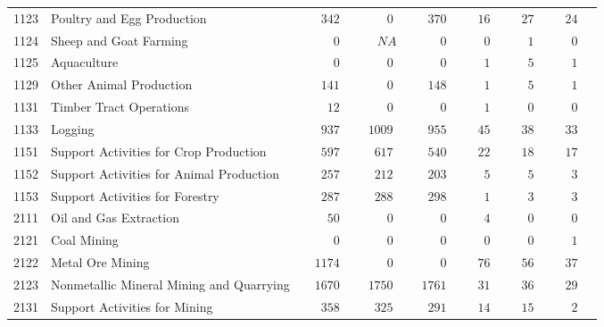 \documentclass[9pt, oneside]{article}   	%
\begin{document}
\begin{longtable}{lp{3 in}ccccccc}
1123  & Poultry and Egg Production & $\phantom{000}342$ & $\phantom{00000}0$ & $\phantom{000}370$ & $\phantom{000}16$ & $\phantom{000}27$ & $\phantom{000}24$ \\
1124  & Sheep and Goat Farming & $\phantom{00000}0$ & $\phantom{0000}NA$ & $\phantom{00000}0$ & $\phantom{0000}0$ & $\phantom{0000}1$ & $\phantom{0000}0$ \\
1125  & Aquaculture & $\phantom{00000}0$ & $\phantom{00000}0$ & $\phantom{00000}0$ & $\phantom{0000}1$ & $\phantom{0000}5$ & $\phantom{0000}1$ \\
1129  & Other Animal Production & $\phantom{000}141$ & $\phantom{00000}0$ & $\phantom{000}148$ & $\phantom{0000}1$ & $\phantom{0000}5$ & $\phantom{0000}1$ \\
1131  & Timber Tract Operations & $\phantom{0000}12$ & $\phantom{00000}0$ & $\phantom{00000}0$ & $\phantom{0000}1$ & $\phantom{0000}0$ & $\phantom{0000}0$ \\
1133  & Logging & $\phantom{000}937$ & $\phantom{00}1009$ & $\phantom{000}955$ & $\phantom{000}45$ & $\phantom{000}38$ & $\phantom{000}33$ \\
1151  & Support Activities for Crop Production & $\phantom{000}597$ & $\phantom{000}617$ & $\phantom{000}540$ & $\phantom{000}22$ & $\phantom{000}18$ & $\phantom{000}17$ \\
1152  & Support Activities for Animal Production & $\phantom{000}257$ & $\phantom{000}212$ & $\phantom{000}203$ & $\phantom{0000}5$ & $\phantom{0000}5$ & $\phantom{0000}3$ \\
1153  & Support Activities for Forestry & $\phantom{000}287$ & $\phantom{000}288$ & $\phantom{000}298$ & $\phantom{0000}1$ & $\phantom{0000}3$ & $\phantom{0000}3$ \\
2111  & Oil and Gas Extraction & $\phantom{0000}50$ & $\phantom{00000}0$ & $\phantom{00000}0$ & $\phantom{0000}4$ & $\phantom{0000}0$ & $\phantom{0000}0$ \\
2121  & Coal Mining & $\phantom{00000}0$ & $\phantom{00000}0$ & $\phantom{00000}0$ & $\phantom{0000}0$ & $\phantom{0000}0$ & $\phantom{0000}1$ \\
2122  & Metal Ore Mining & $\phantom{00}1174$ & $\phantom{00000}0$ & $\phantom{00000}0$ & $\phantom{000}76$ & $\phantom{000}56$ & $\phantom{000}37$ \\
2123  & Nonmetallic Mineral Mining and Quarrying & $\phantom{00}1670$ & $\phantom{00}1750$ & $\phantom{00}1761$ & $\phantom{000}31$ & $\phantom{000}36$ & $\phantom{000}29$ \\
2131  & Support Activities for Mining & $\phantom{000}358$ & $\phantom{000}325$ & $\phantom{000}291$ & $\phantom{000}14$ & $\phantom{000}15$ & $\phantom{0000}2$ \\

\end{longtable}
\end{document}
